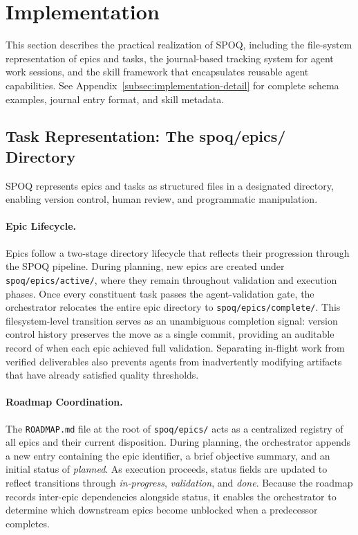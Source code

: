 \section{Implementation}
\label{sec:implementation}

This section describes the practical realization of SPOQ, including the file-system
representation of epics and tasks, the journal-based tracking system for agent
work sessions, and the skill framework that encapsulates reusable agent capabilities.
See Appendix~\ref{subsec:implementation-detail} for complete schema examples,
journal entry format, and skill metadata.

\subsection{Task Representation: The spoq/epics/ Directory}
\label{subsec:task-representation}

SPOQ represents epics and tasks as structured files in a designated directory,
enabling version control, human review, and programmatic manipulation.

\paragraph{Epic Lifecycle.}
Epics follow a two-stage directory lifecycle that reflects their progression through
the SPOQ pipeline. During planning, new epics are created under
\texttt{spoq/epics/active/}, where they remain throughout validation and execution
phases. Once every constituent task passes the agent-validation gate, the orchestrator
relocates the entire epic directory to \texttt{spoq/epics/complete/}. This
filesystem-level transition serves as an unambiguous completion signal: version
control history preserves the move as a single commit, providing an auditable
record of when each epic achieved full validation. Separating in-flight work from
verified deliverables also prevents agents from inadvertently modifying artifacts
that have already satisfied quality thresholds.

\newpage
\paragraph{Roadmap Coordination.}
The \texttt{ROADMAP.md} file at the root of \texttt{spoq/epics/} acts as a
centralized registry of all epics and their current disposition. During planning,
the orchestrator appends a new entry containing the epic identifier, a brief
objective summary, and an initial status of \emph{planned}. As execution proceeds,
status fields are updated to reflect transitions through \emph{in-progress},
\emph{validation}, and \emph{done}. Because the roadmap records inter-epic
dependencies alongside status, it enables the orchestrator to determine which
downstream epics become unblocked when a predecessor completes.

